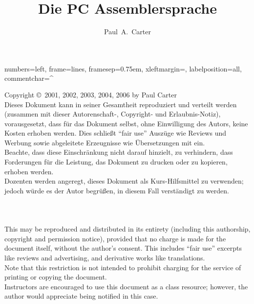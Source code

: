 \documentclass[10pt, a4paper]{book} %
\author{Paul~A.~Carter}
\title{Die PC Assemblersprache}
\begin{document}
\maketitle
\newlength{\AsmMargin}
\setlength{\AsmMargin}{-1cm}
 {numbers=left, frame=lines, framesep=0.75em, xleftmargin=\AsmMargin, labelposition=all, commentchar=^ }

\newcommand{\MarginNote}[1]{\marginpar{\sloppy \em \small #1}}
\thispagestyle{empty}
\vspace*{\fill}
\noindent Copyright \copyright\  2001, 2002, 2003, 2004, 2006 by Paul Carter\\

\noindent Dieses Dokument kann in seiner Gesamtheit reproduziert und
verteilt werden (zusammen mit dieser Autorenschaft-, Copyright- und
Erlaubnis-Notiz), vorausgesetzt, dass f\"{u}r das Dokument selbst, ohne
Einwilligung des Autors, keine Kosten erhoben werden. Dies schlie{\ss}t
"`fair use"' Ausz\"{u}ge wie Reviews und Werbung sowie abgeleitete
Erzeugnisse wie \"{U}bersetzungen mit ein.
\\

\noindent Beachte, dass diese Einschr\"{a}nkung nicht darauf hinzielt,
zu verhindern, dass Forderungen f\"{u}r die Leistung, das Dokument zu
drucken oder zu kopieren, erhoben werden.\\

\noindent Dozenten werden angeregt, dieses Dokument als
Kurs-Hilfsmittel zu verwenden; jedoch w\"{u}rde es der Autor begr\"{u}{\ss}en,
in diesem Fall verst\"{a}ndigt zu werden.
\\
\\
\\
\\

\noindent This may be reproduced and distributed in its entirety
(including this authorship, copyright and permission notice), provided
that no charge is made for the document itself, without the author's
consent. This includes ``fair use'' excerpts like reviews and advertising,
and derivative works like translations.\\

\noindent Note that this restriction is not intended to prohibit charging for
the service of printing or copying the document.\\

\noindent Instructors are encouraged to use this document as a class
resource; however, the author would appreciate being notified in this
case.
\end{document}
